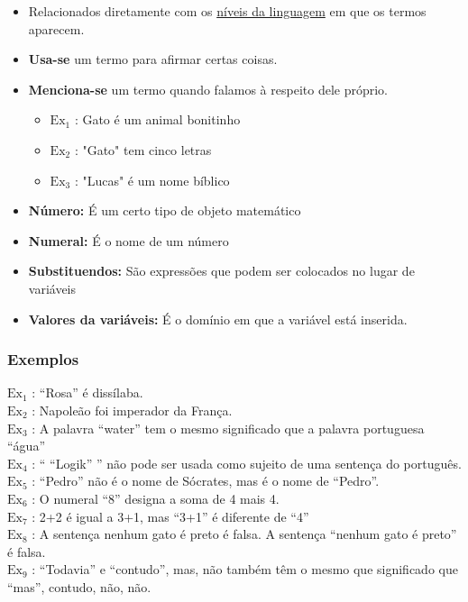         \begin{itemize}[left=0.5cm, align=left, nosep]
            \item Relacionados diretamente com os \underline{níveis da linguagem} em que os termos aparecem.    
            \item \textbf{Usa-se} um termo para afirmar certas coisas.
            \item \textbf{Menciona-se} um termo quando falamos à respeito dele próprio.
            
            \begin{itemize}[left=0.5cm, nosep, label=$\hookrightarrow$]
                \item $\text{Ex}_1$ : Gato é um animal bonitinho
                \item $\text{Ex}_2$ : "Gato" tem cinco letras 
                \item $\text{Ex}_3$ : "Lucas" é um nome bíblico
            \end{itemize}
           
            \item \textbf{Número:} É um certo tipo de objeto matemático
            \item \textbf{Numeral:} É o nome de um número
            \item \textbf{Substituendos:} São expressões que podem ser colocados no lugar de variáveis
            \item \textbf{Valores da variáveis:} É o domínio em que a variável está inserida.

        \end{itemize}
    
        \subsubsection*{Exemplos}
            $\text{Ex}_1$ : “Rosa” é dissílaba. \\
            $\text{Ex}_2$ : Napoleão foi imperador da França. \\
            $\text{Ex}_3$ : A palavra “water” tem o mesmo significado que a palavra portuguesa “água” \\
            $\text{Ex}_4$ : “ “Logik” ” não pode ser usada como sujeito de uma sentença do português. \\
            $\text{Ex}_5$ : “Pedro” não é o nome de Sócrates, mas é o nome de “Pedro”. \\
            $\text{Ex}_6$ : O numeral “8” designa a soma de 4 mais 4. \\
            $\text{Ex}_7$ : 2+2 é igual a 3+1, mas “3+1” é diferente de “4” \\
            $\text{Ex}_8$ : A sentença nenhum gato é preto é falsa. A sentença “nenhum gato é preto” é falsa. \\
            $\text{Ex}_9$ : “Todavia” e “contudo”, mas, não também têm o mesmo que significado que “mas”, contudo, não, não. 
